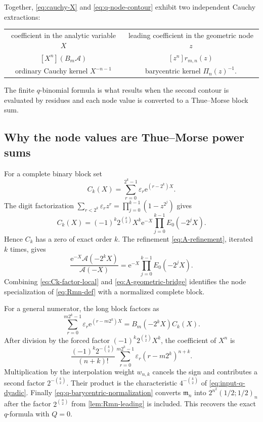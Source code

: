 \documentclass[11pt,oneside]{article}
\theoremstyle{definition}
\theoremstyle{remark}
\newcommand{\e}{\mathrm e}
\newcommand{\tm}{\varepsilon}
\begin{document}
Together, \eqref{eq:cauchy-X} and \eqref{eq:q-node-contour} exhibit two independent Cauchy
extractions:
\begin{center}
\begin{tabular}{c@{\qquad}c}
coefficient in the analytic variable $X$
& leading coefficient in the geometric node $z$ \\
$[X^n](B_m\mathscr A)$
& $[z^n]r_{m,n}(z)$ \\
ordinary Cauchy kernel $X^{-n-1}$
& barycentric kernel $\Pi_n(z)^{-1}$.
\end{tabular}
\end{center}
The finite $q$-binomial formula is what results when the second contour is evaluated by
residues and each node value is converted to a Thue--Morse block sum.

\subsection{Why the node values are Thue--Morse power sums}

For a complete binary block set
\begin{equation}
 C_k(X)=\sum_{r=0}^{2^k-1}\tm_r\e^{(r-2^k)X}.              \label{eq:Ck-local}
\end{equation}
The digit factorization
\(
 \sum_{r<2^k}\tm_rz^r=\prod_{j=0}^{k-1}(1-z^{2^j})
\)
gives
\begin{equation}
 C_k(X)=(-1)^k2^{\binom k2}X^k
 \e^{-X}\prod_{j=0}^{k-1}E_0(-2^jX).                     \label{eq:Ck-factor-local}
\end{equation}
Hence $C_k$ has a zero of exact order $k$.  The refinement
\eqref{eq:A-refinement}, iterated $k$ times, gives
\begin{equation}
 \frac{\e^{-X}\mathscr A(-2^kX)}{\mathscr A(-X)}
 =\e^{-X}\prod_{j=0}^{k-1}E_0(-2^jX).                    \label{eq:A-geometric-bridge}
\end{equation}
Combining \eqref{eq:Ck-factor-local} and \eqref{eq:A-geometric-bridge} identifies the node
specialization of \eqref{eq:Rmn-def} with a normalized complete block.

For a general numerator, the long block factors as
\begin{equation}
 \sum_{r=0}^{m2^k-1}\tm_r\e^{(r-m2^k)X}
 =B_m(-2^kX)C_k(X).                                       \label{eq:long-block-local}
\end{equation}
After division by the forced factor
$(-1)^k2^{\binom k2}X^k$, the coefficient of $X^n$ is
\begin{equation}
 \frac{(-1)^k2^{-\binom k2}}{(n+k)!}
 \sum_{r=0}^{m2^k-1}\tm_r(r-m2^k)^{n+k}.                 \label{eq:node-value-power-sum}
\end{equation}
Multiplication by the interpolation weight $w_{n,k}$ cancels the sign and contributes a
second factor $2^{-\binom k2}$.  Their product is the characteristic
$4^{-\binom k2}$ of \eqref{eq:input-q-dyadic}.  Finally
\eqref{eq:q-barycentric-normalization} converts $\mathfrak m_n$ into
$2^{n^2}(1/2;1/2)_n$ after the factor $2^{\binom n2}$ from
\cref{lem:Rmn-leading} is included.  This recovers the exact $q$-formula with $Q=0$.
\end{document}
